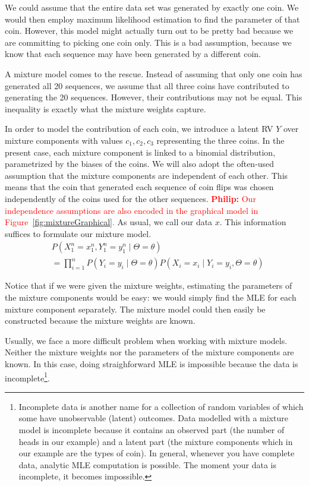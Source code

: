 \documentclass[a4paper,11pt,leqno]{report}\usepackage[]{graphicx}\usepackage[]{color}
\newcommand{\philip}[1]{ \textcolor{red}{\textbf{Philip:} #1}}
\begin{document}
We could assume that the entire data set was generated by exactly one coin. We would then employ maximum likelihood estimation 
to find the parameter of that coin. However, this model might actually turn out to be
pretty bad because we are committing to picking one coin only. This is
a bad assumption, because we know that each sequence may have been generated by a different coin. 

A mixture model comes to the rescue. Instead of assuming that only one coin has generated all 20 sequences,
we assume that all three coins have contributed to generating the 20 sequences. However, their contributions
may not be equal. This inequality is exactly what the mixture weights capture. 

In order to model the contribution of each coin, we introduce a latent RV $ Y $ over mixture components with values $ c_{1}, c_{2}, c_{3} $ representing the three coins.
In the present case, each mixture component is linked to a binomial distribution, parametrized by the biases of
the coins. We will also adopt the often-used assumption
that the mixture components are independent of each other. This means that the coin that generated each
sequence of coin flips was chosen independently of the coins used for the other sequences. \philip{Our independence assumptions
are also encoded in the graphical model in Figure~\eqref{fig:mixtureGraphical}.} As usual, we call our data $ x $. 
This information suffices to formulate our mixture model.
\begin{align} 
&P(X_1^n=x_{1}^{n},Y_{1}^{n}=y_{1}^{n}\mid \Theta=\theta) \label{eq:mixtureExample} \\
&= \prod_{i=1}^{n} P(Y_{i}= y_{i} \mid \Theta=\theta)P(X_{i}=x_{i} \mid Y_{i}=y_{i},\Theta=\theta) \nonumber 
\end{align}

Notice that if we were given the mixture weights, estimating
the parameters of the mixture components would be easy: we would simply find the MLE for each mixture component separately. The mixture
model could then easily be constructed because the mixture weights are known. 

Usually, we face a more difficult problem when working with mixture models. Neither the mixture
weights nor the parameters of the mixture components are known. In this case, doing straighforward MLE is impossible because the data is
incomplete\footnote{Incomplete data is 
  another name for a collection of random variables of which some have unobservable (latent) outcomes. Data modelled with a mixture model is incomplete because it contains
  an observed part (the number of heads in our example) and a latent
  part (the mixture components which in our example are the types of coin). In general, whenever you have complete data, analytic MLE computation is possible. The moment your data is incomplete, it becomes impossible.}. 
\end{document}
